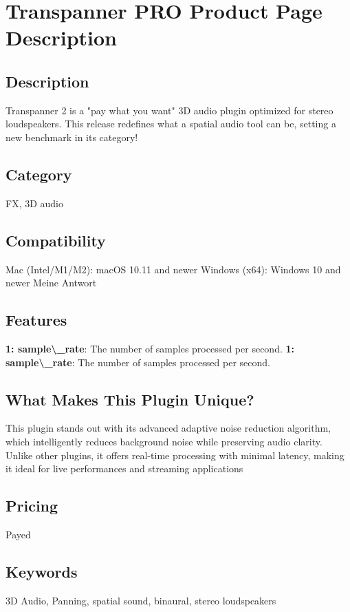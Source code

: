 \documentclass[8pt]{article}
\begin{document}
    \section*{Transpanner PRO  Product Page Description}

    \subsection*{Description}
    Transpanner 2 is a "pay what you want" 3D audio plugin optimized for stereo loudspeakers. This release redefines what a spatial audio tool can be, setting a new benchmark in its category!

    \subsection*{Category}
    FX, 3D audio

    \subsection*{Compatibility}
    Mac (Intel/M1/M2): macOS 10.11 and newer
Windows (x64): Windows 10 and newer
Meine Antwort


    \subsection*{Features}
    \textbf{1: sample\textbackslash{}\_rate}: The number of samples processed per second.
\textbf{1: sample\textbackslash{}\_rate}: The number of samples processed per second.

    \subsection*{What Makes This Plugin Unique?}
    This plugin stands out with its advanced adaptive noise reduction algorithm, which intelligently reduces background noise while preserving audio clarity. Unlike other plugins, it offers real-time processing with minimal latency, making it ideal for live performances and streaming applications

    \subsection*{Pricing}
    Payed

    \subsection*{Keywords}
    3D Audio, Panning, spatial sound, binaural, stereo loudspeakers
\end{document}
